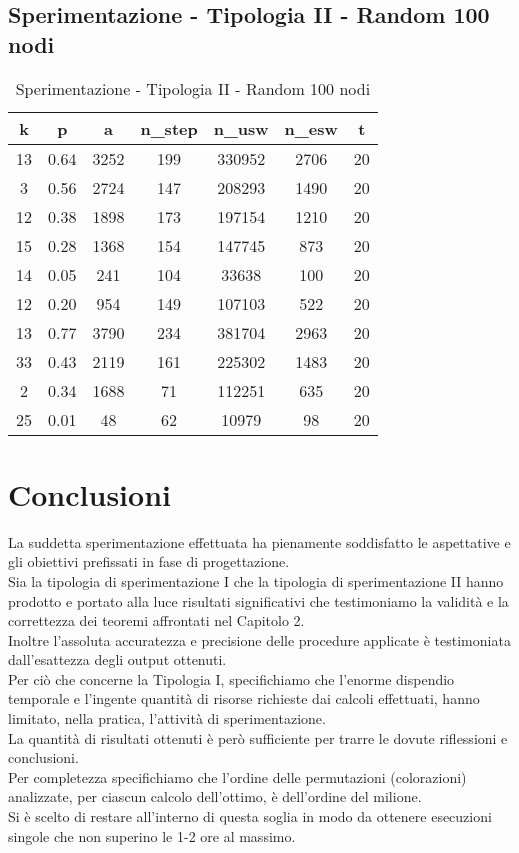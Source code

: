 \subsection{Sperimentazione - Tipologia II - Random 100 nodi}

\begin{table}[H]
\centering
\begin{tabular}{|c|c|c|c|c|c|c|}
\hline
\textbf{k} & \textbf{p} & \textbf{a} & \textbf{n\_step} & \textbf{n\_usw} & \textbf{n\_esw} & \textbf{t} \\ \hline
13 & 0.64 & 3252 & 199 & 330952 & 2706 & 20 \\ \hline
3 & 0.56 & 2724 & 147 & 208293 & 1490 & 20 \\ \hline
12 & 0.38 & 1898 & 173 & 197154 & 1210 & 20 \\ \hline
15 & 0.28 & 1368 & 154 & 147745 & 873 & 20 \\ \hline
14 & 0.05 & 241 & 104 & 33638 & 100 & 20 \\ \hline
12 & 0.20 & 954 & 149 & 107103 & 522 & 20 \\ \hline
13 & 0.77 & 3790 & 234 & 381704 & 2963 & 20 \\ \hline
33 & 0.43 & 2119 & 161 & 225302 & 1483 & 20 \\ \hline
2 & 0.34 & 1688 & 71 & 112251 & 635 & 20 \\ \hline
25 & 0.01 & 48 & 62 & 10979 & 98 & 20 \\ \hline
\end{tabular}
\caption{Sperimentazione - Tipologia II - Random 100 nodi}
\label{tab:sperimentazione-tipo1-100nodi}
\end{table}

\section{Conclusioni}
\justify
La suddetta sperimentazione effettuata ha pienamente soddisfatto le aspettative e gli obiettivi prefissati in fase di progettazione.\\
Sia la tipologia di sperimentazione I che la tipologia di sperimentazione II hanno prodotto e portato alla luce risultati significativi che testimoniamo la validità e la correttezza dei teoremi affrontati nel Capitolo 2.\\
Inoltre l'assoluta accuratezza e precisione delle procedure applicate è testimoniata dall'esattezza degli output ottenuti.\\

Per ciò che concerne la Tipologia I, specifichiamo che l'enorme dispendio temporale e l'ingente quantità di risorse richieste dai calcoli effettuati, hanno limitato, nella pratica, l'attività di sperimentazione.\\
La quantità di risultati ottenuti è però sufficiente per trarre le dovute riflessioni e conclusioni.\\
Per completezza specifichiamo che l'ordine delle permutazioni (colorazioni) analizzate, per ciascun calcolo dell'ottimo, è dell'ordine del milione.\\
Si è scelto di restare all'interno di questa soglia in modo da ottenere esecuzioni singole che non superino le 1-2 ore al massimo.\\

